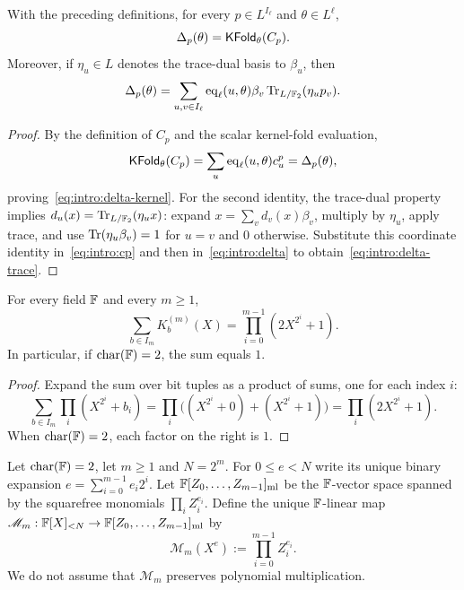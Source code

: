 \begin{proposition}\label{prop:intro:delta}
With the preceding definitions, for every $p\in L^{I_\ell}$ and $\theta\in L^\ell$,
\begin{equation}\label{eq:intro:delta-kernel}
 \Delta_p(\theta)=\mathsf{KFold}_\theta(C_p).
\end{equation}
Moreover, if $\eta_u\in L$ denotes the trace-dual basis to $\beta_u$, then
\begin{equation}\label{eq:intro:delta-trace}
 \Delta_p(\theta)=\sum_{u,v\in I_\ell}\operatorname{eq}_\ell(u,\theta)\beta_v\operatorname{Tr}_{L/\mathbb{F}_2}(\eta_u p_v).
\end{equation}
\end{proposition}
\begin{proof}
By the definition of $C_p$ and the scalar kernel-fold evaluation,
\[
 \mathsf{KFold}_\theta(C_p)=\sum_u\operatorname{eq}_\ell(u,\theta)c^p_u=\Delta_p(\theta),
\]
proving~\eqref{eq:intro:delta-kernel}. For the second identity, the trace-dual property implies $d_u(x)=\operatorname{Tr}_{L/\mathbb{F}_2}(\eta_u x)$: expand $x=\sum_vd_v(x)\beta_v$, multiply by $\eta_u$, apply trace, and use $\operatorname{Tr}(\eta_u\beta_v)=1$ for $u=v$ and $0$ otherwise. Substitute this coordinate identity in~\eqref{eq:intro:cp} and then in~\eqref{eq:intro:delta} to obtain~\eqref{eq:intro:delta-trace}.
\end{proof}

\begin{lemma}\label{lem:intro:partition}
For every field $\mathbb{F}$ and every $m\geq1$,
\begin{equation}\label{eq:intro:partition}
 \sum_{b\in I_m}K_b^{(m)}(X)=\prod_{i=0}^{m-1}(2X^{2^i}+1).
\end{equation}
In particular, if $\operatorname{char}(\mathbb{F})=2$, the sum equals $1$.
\end{lemma}
\begin{proof}
Expand the sum over bit tuples as a product of sums, one for each index $i$:
\[
 \sum_{b\in I_m}\prod_i(X^{2^i}+b_i)
  =\prod_i\bigl((X^{2^i}+0)+(X^{2^i}+1)\bigr)
  =\prod_i(2X^{2^i}+1).
\]
When $\operatorname{char}(\mathbb{F})=2$, each factor on the right is $1$.
\end{proof}

\begin{definition}\label{def:intro:mlization}
Let $\operatorname{char}(\mathbb{F})=2$, let $m\geq1$ and $N=2^m$. For $0\leq e<N$ write its unique binary expansion $e=\sum_{i=0}^{m-1}e_i2^i$. Let $\mathbb{F}[Z_0,\ldots,Z_{m-1}]_{\mathrm{ml}}$ be the $\mathbb{F}$-vector space spanned by the squarefree monomials $\prod_i Z_i^{e_i}$. Define the unique $\mathbb{F}$-linear map $\mathscr M_m:\mathbb{F}[X]_{<N}\to\mathbb{F}[Z_0,\ldots,Z_{m-1}]_{\mathrm{ml}}$ by
\[
 \mathscr M_m(X^e):=\prod_{i=0}^{m-1}Z_i^{e_i}.
\]
We do not assume that $\mathscr M_m$ preserves polynomial multiplication.
\end{definition}

